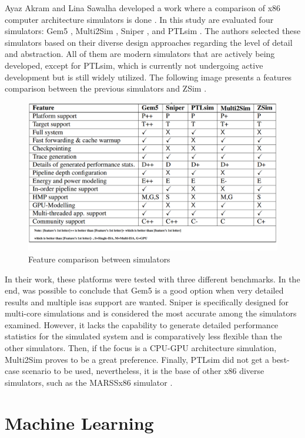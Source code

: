Ayaz Akram and Lina Sawalha developed a work where a comparison of x86 computer architecture simulators is done \cite{akram2016comparison}. In this study are evaluated four simulators: Gem5 \cite{TheGem5Simulator}, Multi2Sim \cite{ubal2012multi2sim}, Sniper \cite{carlson2011sniper}, and PTLsim \cite{yourst2007ptlsim}. The authors selected these simulators based on their diverse design approaches regarding the level of detail and abstraction. All of them are modern simulators that are actively being developed, except for PTLsim, which is currently not undergoing active development but is still widely utilized. The following image presents a features comparison between the previous simulators and ZSim \cite{sanchez2013zsim}. 

\begin{figure}[H]
	\centering
 	\includegraphics[width=0.7\linewidth]{Images/ComparationTableSimulators.png}
 	\caption{Feature comparison between simulators \cite{akram2016comparison}}
	 \label{fig_ComparationTableSimulators}
\end{figure}

In their work, these platforms were tested with three different benchmarks. In the end, was possible to conclude that Gem5 is a good option when very detailed results and multiple \glspl{isa} support are wanted. Sniper is specifically designed for multi-core simulations and is considered the most accurate among the simulators examined. However, it lacks the capability to generate detailed performance statistics for the simulated system and is comparatively less flexible than the other simulators. Then, if the focus is a CPU-GPU architecture simulation, Multi2Sim proves to be a great preference. Finally, PTLsim did not get a best-case scenario to be used, nevertheless, it is the base of other x86 diverse simulators, such as the MARSSx86 simulator \cite{patel2011marss}.

\section{Machine Learning}

